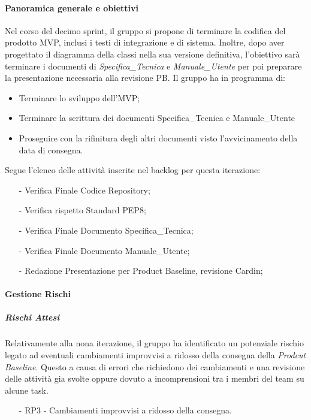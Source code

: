 \documentclass[10pt]{article}
\begin{document}
{{{{{{{{{{{            \paragraph{Panoramica generale e obiettivi}\mbox{}\vspace{0.4em}
            Nel corso del decimo sprint, il gruppo si propone di terminare la codifica del prodotto MVP, inclusi i testi di integrazione e di sistema. Inoltre, dopo aver progettato il diagramma della classi nella sua versione definitiva, l'obiettivo sarà terminare i documenti di \textit{Specifica\_Tecnica} e \textit{Manuale\_Utente} per poi preparare la presentazione necessaria alla revisione PB.
            Il gruppo ha in programma di:
            \begin{itemize}
                \item Terminare lo sviluppo dell'MVP;
                \item Terminare la scrittura dei documenti Specifica\_Tecnica e Manuale\_Utente
                \item Proseguire con la rifinitura degli altri documenti visto l'avvicinamento della data di consegna.
            \end{itemize}
            Segue l'elenco delle attività inserite nel backlog per questa iterazione:
            \vspace{-0.5em}
            \begin{itemize}
            \setlength\itemsep{-0.2em}
                \item [-] Verifica Finale Codice Repository;
                \item [-] Verifica rispetto Standard PEP8;
                \item [-] Verifica Finale Documento Specifica\_Tecnica;
                \item [-] Verifica Finale Documento Manuale\_Utente;
                \item [-] Redazione Presentazione per Product Baseline, revisione Cardin;
            \end{itemize}
    
            \paragraph{Gestione Rischi}\mbox{}
            \vspace{-1em}
            \subparagraph*{Rischi Attesi}\mbox{}
            
            Relativamente alla nona iterazione, il gruppo ha identificato un potenziale rischio legato ad eventuali cambiamenti improvvisi a ridosso della consegna della \textit{Prodcut Baseline}. Questo a causa di errori che richiedono dei cambiamenti e una revisione delle attività gia svolte oppure dovuto a incomprensioni tra i membri del team su alcune task.
            \vspace{-0.5em}
            \begin{itemize}
            \setlength\itemsep{-0.2em}
            \item [-]  RP3 - Cambiamenti improvvisi a ridosso della consegna.
            \end{itemize}
    
}}}}}}}}}}}
\end{document}
